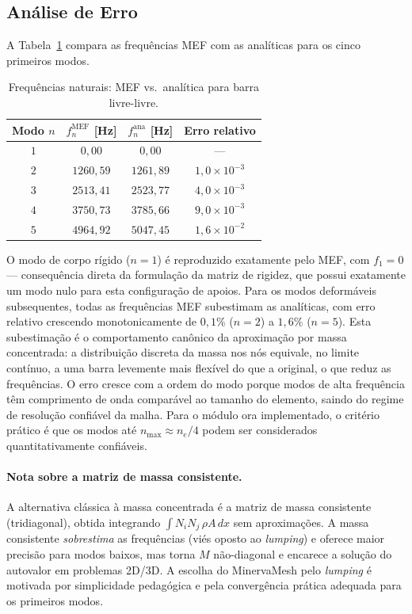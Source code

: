 \subsection{Análise de Erro}

A Tabela~\ref{tab:val_vibracao_erros} compara as frequências MEF com as analíticas para os cinco primeiros modos.

\begin{table}[htbp]
    \centering
    \caption{Frequências naturais: MEF vs.\ analítica para barra livre-livre.}
    \label{tab:val_vibracao_erros}
    \begin{tabular}{cccc}
        \hline
        \textbf{Modo} $n$ & $f_n^{\text{MEF}}$ [Hz] & $f_n^{\text{ana}}$ [Hz] & \textbf{Erro relativo} \\
        \hline
        $1$ & $0{,}00$   & $0{,}00$   & ---                      \\
        $2$ & $1260{,}59$ & $1261{,}89$ & $1{,}0 \times 10^{-3}$ \\
        $3$ & $2513{,}41$ & $2523{,}77$ & $4{,}0 \times 10^{-3}$ \\
        $4$ & $3750{,}73$ & $3785{,}66$ & $9{,}0 \times 10^{-3}$ \\
        $5$ & $4964{,}92$ & $5047{,}45$ & $1{,}6 \times 10^{-2}$ \\
        \hline
    \end{tabular}
\end{table}

O modo de corpo rígido ($n = 1$) é reproduzido exatamente pelo MEF, com $f_1 = 0$ --- consequência direta da formulação da matriz de rigidez, que possui exatamente um modo nulo para esta configuração de apoios. Para os modos deformáveis subsequentes, todas as frequências MEF subestimam as analíticas, com erro relativo crescendo monotonicamente de $0{,}1\%$ ($n = 2$) a $1{,}6\%$ ($n = 5$). Esta subestimação é o comportamento canônico da aproximação por massa concentrada: a distribuição discreta da massa nos nós equivale, no limite contínuo, a uma barra levemente mais flexível do que a original, o que reduz as frequências. O erro cresce com a ordem do modo porque modos de alta frequência têm comprimento de onda comparável ao tamanho do elemento, saindo do regime de resolução confiável da malha. Para o módulo ora implementado, o critério prático é que os modos até $n_{\max} \approx n_e / 4$ podem ser considerados quantitativamente confiáveis.

\paragraph{Nota sobre a matriz de massa consistente.} A alternativa clássica à massa concentrada é a matriz de massa consistente (tridiagonal), obtida integrando $\int N_i N_j \, \rho A \, dx$ sem aproximações. A massa consistente \emph{sobrestima} as frequências (viés oposto ao \emph{lumping}) e oferece maior precisão para modos baixos, mas torna $M$ não-diagonal e encarece a solução do autovalor em problemas 2D/3D. A escolha do MinervaMesh pelo \emph{lumping} é motivada por simplicidade pedagógica e pela convergência prática adequada para os primeiros modos.

